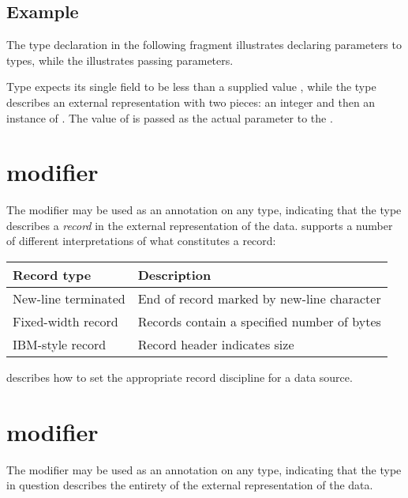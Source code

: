 \subsection{Example}
The  type declaration in the following \padsl{}
fragment illustrates declaring parameters to \pads{} types, while
the  illustrates passing parameters.
\begin{code}
\end{code}
Type  expects its single field  to be
less than a supplied value , while the type 
describes an external representation with two pieces: an integer
 and then an instance of .  The value
of  is passed as the actual parameter to the 
\pstruct{}. 

\section{\Precord{} modifier}
\label{sec:commong-precord}
The \Precord{} modifier may be used as an annotation on any \pads{}
type, indicating that the type describes a \textit{record} in the
external representation of the data.  \pads{} supports a number of
different interpretations of what constitutes a record:

\begin{center}
\begin{tabular}{l|l}
Record type         & Description\\ \hline
New-line terminated & End of record marked by new-line character\\
Fixed-width record  & Records contain a specified number of bytes\\
IBM-style record    & Record header indicates size\\
\end{tabular}
\end{center}

\noindent
{} describes how
to set the appropriate record discipline for a data source. 


\section{\Psource{} modifier}
\label{sec:common-pfile}
The \Psource{} modifier may be used as an annotation on any \pads{}
type, indicating that the type in question describes the entirety of
the external representation of the data.

